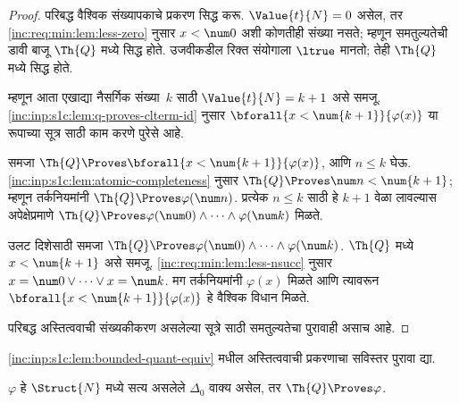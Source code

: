 \begin{proof}
    परिबद्ध वैश्विक संख्यापकाचे प्रकरण सिद्ध करू.
    $\Value{t}{N} = 0$ असेल, तर
    \ref{inc:req:min:lem:less-zero} नुसार
    $x<\num 0$ अशी कोणतीही संख्या नसते; म्हणून
    समतुल्यतेची डावी बाजू $\Th{Q}$ मध्ये सिद्ध होते.
    उजवीकडील रिक्त संयोगाला $\ltrue$ मानतो;
    तेही $\Th{Q}$ मध्ये सिद्ध होते.

    म्हणून आता एखाद्या नैसर्गिक संख्या~$k$ साठी
    $\Value{t}{N} = k+1$ असे समजू.
    \ref{inc:inp:s1c:lem:q-proves-clterm-id} नुसार
    $\bforall{x<\num{k+1}}{\varphi(x)}$ या रूपाच्या
    सूत्र साठी काम करणे पुरेसे आहे.

    समजा
    $\Th{Q} \Proves \bforall{x<\num{k+1}}{\varphi(x)}$,
    आणि $n \leq k$ घेऊ.
    \ref{inc:inp:s1c:lem:atomic-completeness} नुसार
    $\Th{Q} \Proves \num n < \num{k+1}$;
    म्हणून तर्कनियमांनी
    $\Th{Q} \Proves \varphi(\num n)$.
    प्रत्येक $n \leq k$ साठी हे $k+1$ वेळा
    लावल्यास अपेक्षेप्रमाणे
    $\Th{Q} \Proves \varphi(\num 0)
    \land \dots \land \varphi(\num k)$ मिळते.

    उलट दिशेसाठी समजा
    $\Th{Q} \Proves
    \varphi(\num 0) \land \dots \land \varphi(\num k)$.
    $\Th{Q}$ मध्ये $x < \num{k+1}$ असे समजू.
    \ref{inc:req:min:lem:less-nsucc} नुसार
    $x = \num 0 \lor \dots \lor x = \num k$.
    मग तर्कनियमांनी $\varphi(x)$ मिळते आणि त्यावरून
    $\bforall{x<\num{k+1}}{\varphi(x)}$ हे वैश्विक विधान
    मिळते.

    परिबद्ध अस्तित्ववाची संख्यकीकरण असलेल्या
    सूत्रे साठी समतुल्यतेचा पुरावाही असाच आहे.
\end{proof}

\begin{prob}
\ref{inc:inp:s1c:lem:bounded-quant-equiv} मधील अस्तित्ववाची
प्रकरणाचा सविस्तर पुरावा द्या.
\end{prob}

\begin{lem}
\label{inc:inp:s1c:lem:delta0-completeness}
$\varphi$ हे $\Struct{N}$ मध्ये सत्य असलेले
$\Delta_0$ वाक्य असेल, तर
$\Th{Q} \Proves \varphi$.
\end{lem}

